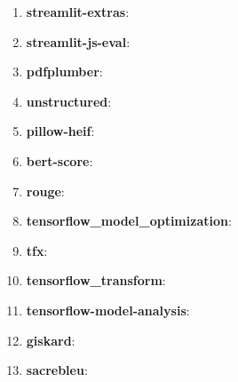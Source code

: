 \begin{enumerate}
    \item \textbf{streamlit-extras}:
    \item \textbf{streamlit-js-eval}:
    \item \textbf{pdfplumber}:
    \item \textbf{unstructured}:
    \item \textbf{pillow-heif}:
    \item \textbf{bert-score}:
    \item \textbf{rouge}:
    \item \textbf{tensorflow\_model\_optimization}:
    \item \textbf{tfx}:
    \item \textbf{tensorflow\_transform}:
    \item \textbf{tensorflow-model-analysis}:
    \item \textbf{giskard}:
    \item \textbf{sacrebleu}:
\end{enumerate}

\newpage

